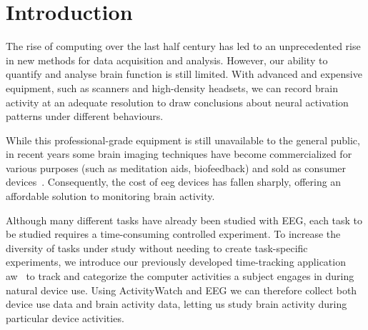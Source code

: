 \chapter{Introduction}




The rise of computing over the last half century has led to an unprecedented rise in new methods for data acquisition and analysis. However, our ability to quantify and analyse brain function is still limited. With advanced and expensive equipment, such as  scanners and high-density  headsets, we can record brain activity at an adequate resolution to draw conclusions about neural activation patterns under different behaviours.

While this professional-grade equipment is still unavailable to the general public, in recent years some brain imaging techniques have become commercialized for various purposes (such as meditation aids, biofeedback) and sold as consumer devices~\cite{sawangjai_consumer_2020}. Consequently, the cost of \gls{eeg} devices has fallen sharply, offering an affordable solution to monitoring brain activity.


Although many different tasks have already been studied with EEG, each task to be studied requires a time-consuming controlled experiment. To increase the diversity of tasks under study without needing to create task-specific experiments, we introduce our previously developed time-tracking application \gls{aw}~\cite{bjareholt_activitywatch_2020} to track and categorize the computer activities a subject engages in during natural device use. Using ActivityWatch and EEG we can therefore collect both device use data and brain activity data, letting us study brain activity during particular device activities.


